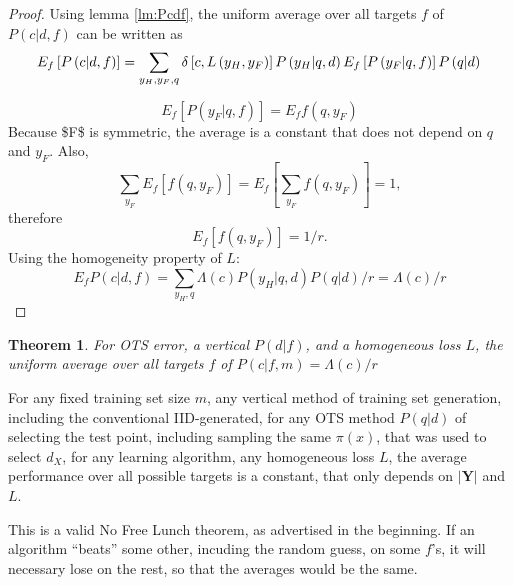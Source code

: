 \documentclass[a4paper]{article}
\newtheorem{theorem}{Theorem}[section]
\begin{document}
\begin{proof}
  Using lemma \ref{lm:Pcdf}, the uniform average over all targets $f$
  of $P\left(c|d,f\right)$ can be written as
  \begin{equation}
    E_f \left[P\left(c|d,f\right)\right] = \sum_{y_H,y_F,q}
      \delta\left[c,L\left(y_H, y_F\right)\right]
      P\left(y_H|q,d\right) E_f \left[P\left(y_F|q,f\right)\right] P\left(q|d\right) \\
  \end{equation}

  \begin{equation}
    E_f \left[P\left(y_F|q,f\right)\right] = E_f f(q,y_F)
  \end{equation}
  Because \gls{$F$} is symmetric, the average is a constant that does
  not depend on $q$ and $y_F$. Also,
  \begin{equation}
    \sum_{y_F} E_f\left[f(q, y_F)\right] = E_f\left[\sum_{y_F} f(q, y_F)\right] = 1,  
  \end{equation}
  therefore
  \begin{equation}
    E_f\left[f(q, y_F)\right] = 1/r.
  \end{equation}
  Using the homogeneity property of $L$:
  \begin{equation}
    E_f P\left(c|d,f\right) = \sum_{y_H, q} \Lambda(c)
    P\left(y_H|q,d\right)  P\left(q|d\right) / r = \Lambda(c)/r
  \end{equation}
\end{proof}

\begin{theorem}
  For \gls{OTS error}, a \gls{vertical} $P\left(d|f\right)$, and a
  homogeneous loss $L$, the uniform average over all targets $f$ of
  $P\left(c|f, m\right) = \Lambda(c)/r$
  \label{th:Pcfm}
\end{theorem}

For any fixed training set size $m$, any \gls{vertical} method of
training set generation, including the conventional IID-generated, for
any OTS method $P(q|d)$ of selecting the test point, including
sampling the same $\pi(x)$, that was used to select $d_X$, for any
learning algorithm, any homogeneous loss $L$, the average performance
over all possible targets is a constant, that only depends on
$\left|\mathbf{Y}\right|$ and $L$.

This is a valid No Free Lunch theorem, as advertised in the
beginning. If an algorithm ``beats'' some other, incuding the random
guess, on some $f$'s, it will necessary lose on the rest, so that the
averages would be the same.
\end{document}
